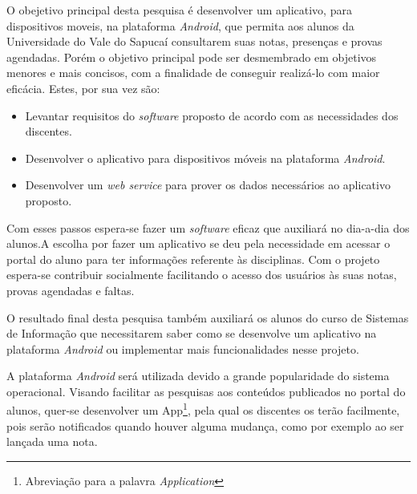 	
	\par O obejetivo principal desta pesquisa é desenvolver um aplicativo,
para dispositivos moveis, na plataforma \textit{Android}, que permita aos
alunos da Universidade do Vale do Sapucaí consultarem suas notas, presenças e
provas agendadas. Porém o objetivo principal pode ser desmembrado em objetivos
menores e mais concisos, com a finalidade de conseguir realizá-lo com maior
eficácia. Estes, por sua vez são:
	
	\begin{itemize}
	  
	  \item Levantar requisitos do \textit{software} proposto de acordo com as
	  necessidades dos discentes.
	  
	  \item Desenvolver o aplicativo para dispositivos móveis na plataforma
	  \textit{Android}.
	  
	  \item Desenvolver um \textit{web service} para prover os dados necessários ao
	  aplicativo proposto.
	
	\end{itemize}
	
	\par Com esses passos espera-se fazer um \textit{software} eficaz que auxiliará
no dia-a-dia dos alunos.A escolha por fazer um aplicativo se deu pela
necessidade em acessar o portal do aluno para ter informações referente às
disciplinas. Com o projeto espera-se contribuir socialmente facilitando o
acesso dos usuários às suas notas, provas agendadas e faltas.

	\par O resultado final desta pesquisa também auxiliará os alunos do curso de
Sistemas de Informação que necessitarem saber como se desenvolve um aplicativo
na plataforma \textit{Android} ou implementar mais funcionalidades nesse
projeto.

	\par A plataforma \textit{Android} será utilizada devido a grande popularidade
do sistema operacional. Visando facilitar as pesquisas aos conteúdos publicados
no portal do alunos, quer-se desenvolver um App\footnote{Abreviação para a
palavra \textit{Application}}, pela qual os discentes os terão facilmente, pois
serão notificados quando houver alguma mudança, como por exemplo ao ser lançada
uma nota.
